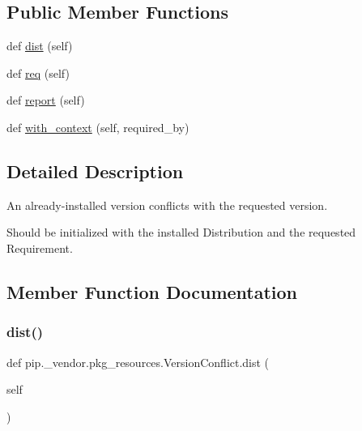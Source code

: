 \subsection*{Public Member Functions}
\begin{DoxyCompactItemize}
\item 
def \hyperlink{classpip_1_1__vendor_1_1pkg__resources_1_1VersionConflict_ab3d8caac5c0236cd06cdfafaae139b5c}{dist} (self)
\item 
def \hyperlink{classpip_1_1__vendor_1_1pkg__resources_1_1VersionConflict_a575a61fcd835fa61b81fb5e92f89eed1}{req} (self)
\item 
def \hyperlink{classpip_1_1__vendor_1_1pkg__resources_1_1VersionConflict_a26278acf08b3652298f40516074714bf}{report} (self)
\item 
def \hyperlink{classpip_1_1__vendor_1_1pkg__resources_1_1VersionConflict_a24e35a1032e343205008e7a7591a669a}{with\+\_\+context} (self, required\+\_\+by)
\end{DoxyCompactItemize}


\subsection{Detailed Description}
\begin{DoxyVerb}An already-installed version conflicts with the requested version.

Should be initialized with the installed Distribution and the requested
Requirement.
\end{DoxyVerb}
 

\subsection{Member Function Documentation}
\mbox{\label{classpip_1_1__vendor_1_1pkg__resources_1_1VersionConflict_ab3d8caac5c0236cd06cdfafaae139b5c}} 
\subsubsection{\texorpdfstring{dist()}{dist()}}
{\footnotesize\ttfamily def pip.\+\_\+vendor.\+pkg\+\_\+resources.\+Version\+Conflict.\+dist (\begin{DoxyParamCaption}\item[{}]{self }\end{DoxyParamCaption})}

